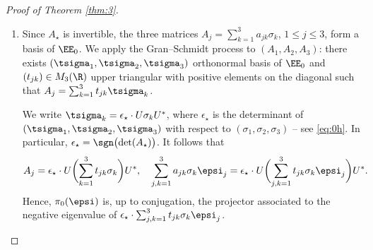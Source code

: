 \begin{proof}[Proof of Theorem \ref{thm:3}]
\begin{enumerate}
For $\epsi \neq 0$, the matrix $\sum_{j, k=1}^3 a_{jk} \sigma_k \epsi_j$ has two opposite, distinct eigenvalues. Let $\pi_0(\epsi)$ be the projector to the negative eigenvalue. Then
\begin{align*}
\pi(\zeta_\star+\epsi) &= \pi_0(\epsi) + O(|\epsi|), & \nabla\pi(\zeta_\star+\epsi) &= \nabla\pi_0(\epsi) + O(1),
\\
\nabla\pi(\zeta_\star+\epsi) &= O(|\epsi|^{-1}), & \nabla\pi_0(\zeta_\star+\epsi) &= O(|\epsi|^{-1}).
\end{align*}
We refer to the proof of \cite[Lem.\,2.4]{D19b} for such estimates. It follows that
\begin{equation*}
	b(\zeta_\star+\epsi) = b_0(\epsi) + O(|\epsi|^{-1}), \quad \text{where} \ \ b_0(\epsi) = \Tr_{\C^N} \left( \pi_0(\epsi) \bigl[ \p_{\xi_1} \pi_0(\epsi), \p_{\xi_2} \pi_0(\epsi) \bigr]\right).
\end{equation*}
Grouping with \eqref{eq:0l}, we obtain $B_n(\zeta_\star+\epsi) = b_0(\epsi) + O(|\epsi|^{-1})$. In particular,
\begin{equation}\label{eq:0o}
\begin{split}
\int_{|\xi-\xi_\star| \leq r}\hspace*{-2mm} B_n(s_\star\pm\delta,\xi) d\xi &= \int_{|\xi-\xi_\star| \leq r}\hspace*{-2mm} b_0(\pm\delta,\xi-\xi_\star) d\xi + O\biggl(\int_{|\xi-\xi_\star| \leq r} \dfrac{1}{|\xi-\xi_\star|} d\xi\biggr)
\\
&= \int_{|\xi| \leq r} b_0(\pm\delta,\xi) d\xi + O(r).
\end{split}
\end{equation}

\item
Since $A_\star$ is invertible, the three matrices $A_j = \sum_{k=1}^3 a_{jk} \sigma_k$, $1 \leq j \leq 3$, form a basis of $\EE_0$. We apply the Gran--Schmidt process to $(A_1, A_2, A_3)$: there exists $(\tsigma_1,\tsigma_2,\tsigma_3)$ orthonormal basis of $\EE_0$ and $(t_{jk}) \in M_3(\R)$ upper triangular with positive elements on the diagonal such that $A_j = \sum_{k=1}^3 t_{jk} \tsigma_k$.

We write $\tsigma_k = \epsilon_\star \cdot U \sigma_k U^*$, where $\epsilon_\star$ is the determinant of $(\tsigma_1,\tsigma_2,\tsigma_3)$ with respect to $(\sigma_1,\sigma_2,\sigma_3)$ -- see \eqref{eq:0h}. In particular, $\epsilon_\star = \sgn\bigl( \det(A_\star)\bigr)$. It follows that
\begin{equation*}
A_j = \epsilon_\star \cdot U \biggl(\sum_{k=1}^3 t_{jk} \sigma_k\biggr) U^*, \quad \sum_{j, k=1}^3 a_{jk} \sigma_k \epsi_j = \epsilon_\star \cdot U \biggl(\sum_{j, k=1}^3 t_{jk} \sigma_k \epsi_j \biggr) U^*.
\end{equation*}
Hence, $\pi_0(\epsi)$ is, up to conjugation, the projector associated to the negative eigenvalue of $\epsilon_\star \cdot \sum_{j, k=1}^3 t_{jk} \sigma_k \epsi_j$.


\end{enumerate}
\end{proof}
